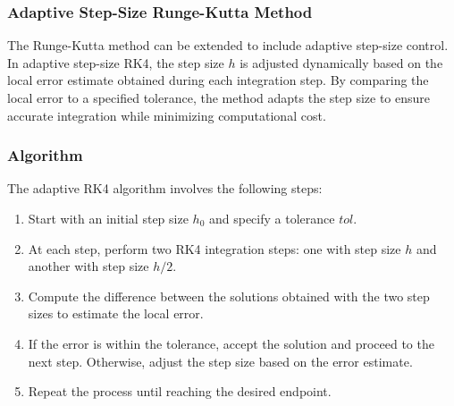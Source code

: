 \documentclass[a4paper,12pt,french]{article}
\begin{document}
%
%   
%
%   


\subsubsection{Adaptive Step-Size Runge-Kutta Method}

The Runge-Kutta method can be extended to include adaptive step-size control. In adaptive step-size RK4, the step size \(h\) is adjusted dynamically based on the local error estimate obtained during each integration step. By comparing the local error to a specified tolerance, the method adapts the step size to ensure accurate integration while minimizing computational cost.

\subsubsection*{Algorithm}

The adaptive RK4 algorithm involves the following steps:

\begin{enumerate}
    \item Start with an initial step size \(h_0\) and specify a tolerance \(tol\).
    \item At each step, perform two RK4 integration steps: one with step size \(h\) and another with step size \(h/2\).
    \item Compute the difference between the solutions obtained with the two step sizes to estimate the local error.
    \item If the error is within the tolerance, accept the solution and proceed to the next step. Otherwise, adjust the step size based on the error estimate.
    \item Repeat the process until reaching the desired endpoint.
\end{enumerate}
\end{document}
